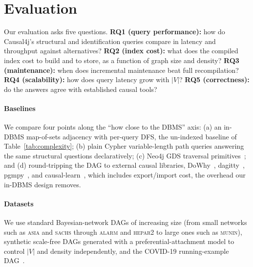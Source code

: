 \section{Evaluation}\label{sec:eval}


Our evaluation asks five questions. \textbf{RQ1 (query performance):} how do
Causal4j's structural and identification queries compare in latency and
throughput against alternatives? \textbf{RQ2 (index cost):} what does the
compiled index cost to build and to store, as a function of graph size and
density? \textbf{RQ3 (maintenance):} when does incremental maintenance beat full
recompilation? \textbf{RQ4 (scalability):} how does query latency grow with
$|V|$? \textbf{RQ5 (correctness):} do the answers agree with established causal
tools?

\paragraph{Baselines}
We compare four points along the ``how close to the DBMS'' axis: (a) an in-DBMS
map-of-sets adjacency with per-query DFS, the un-indexed baseline of
Table~\ref{tab:complexity}; (b) plain Cypher variable-length path queries
answering the same structural questions declaratively; (c) Neo4j GDS traversal
primitives~\cite{TODO_neo4j}; and (d) round-tripping the DAG to external causal
libraries, DoWhy~\cite{TODO_dowhy}, dagitty~\cite{TODO_dagitty},
pgmpy~\cite{TODO_pgmpy}, and causal-learn~\cite{TODO_causallearn}, which
includes export/import cost, the overhead our in-DBMS design removes.

\paragraph{Datasets}
We use standard Bayesian-network DAGs of increasing size (from small networks such
as \textsc{asia} and \textsc{sachs} through \textsc{alarm} and \textsc{hepar2} to
large ones such as \textsc{munin}), synthetic scale-free DAGs generated with a
preferential-attachment model to control $|V|$ and density independently, and the
COVID-19 running-example DAG~\cite{piccininni2020covid}. 

